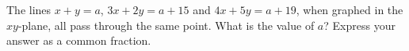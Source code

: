 The lines $x+y=a$, $3x+2y=a+15$ and $4x+5y=a+19$, when graphed in the $xy$-plane, all pass through the same point. What is the value of $a$? Express your answer as a common fraction.

